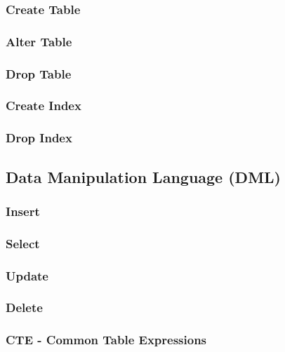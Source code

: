 \begin{multicols}{2}
        \subsubsection{Create Table}
            
        \subsubsection{Alter Table}
            
        \subsubsection{Drop Table}
            
        \subsubsection{Create Index}
            
        \subsubsection{Drop Index}
            
    \subsection{Data Manipulation Language (DML)}
        \subsubsection{Insert}
            
        \subsubsection{Select}
            
        \subsubsection{Update}
            
        \subsubsection{Delete}
            
        \subsubsection{CTE - Common Table Expressions}
            

\end{multicols}
